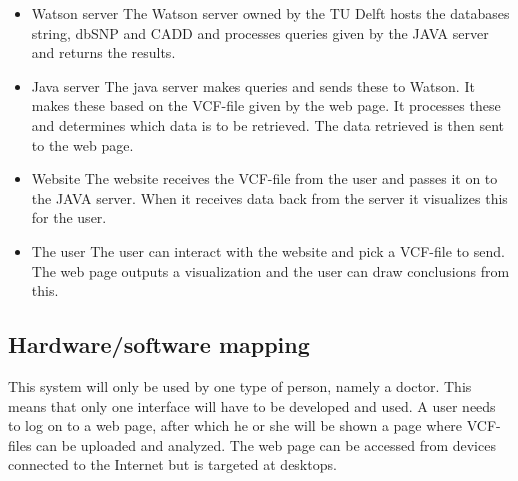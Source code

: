 		\begin{itemize}
			\item Watson server
				\subitem The Watson server owned by the TU Delft hosts the databases string\cite{franceschini2013string}, dbSNP\cite{sherry2001dbsnp} and CADD\cite{kircher2014general} and processes queries given by the JAVA server and returns the results.
			\item Java server
				\subitem The java server makes queries and sends these to Watson. It makes these based on the VCF-file given by the web page. It processes these and determines which data is to be retrieved. The data retrieved is then sent to the web page.
			\item Website
				\subitem The website receives the VCF-file from the user and passes it on to the JAVA server. When it receives data back from the server it visualizes this for the user.
			\item The user 
				\subitem The user can interact with the website and pick a VCF-file to send. The web page outputs a visualization and the user can draw conclusions from this.
		\end{itemize}
	\subsection{Hardware/software mapping}
		This system will only be used by one type of person, namely a doctor. This means that only one interface will have to be developed and used. A user needs to log on to a web page, after which he or she will be shown a page where VCF-files can be uploaded and analyzed. The web page can be accessed from devices connected to the Internet but is targeted at desktops.
